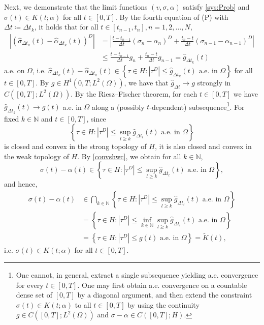 \documentclass[11pt, a4paper]{article}
\newcommand{\N}{{\mathbb N}}
\newcommand{\defeq}{\coloneqq}
\newcommand{\dt}{{\Delta t}}
\newcommand{\Lo}{{L^2(\Omega)}}
\newcommand{\Hs}{{H}}
\begin{document}
Next, we demonstrate that the limit functions $(v, \sigma, \alpha)$ satisfy \eqref{sys:Prob} and $\sigma(t) \in K(t;\alpha)$ for all $t \in [0, T]$.
By the fourth equation of (P) with $\dt\defeq\dt_k$, it holds that for all $t\in[t_{n-1},t_n],n=1,2,\ldots,N$,
\[\begin{aligned}
    |(\hat{\sigma}_{\dt_k}(t) - \hat{\alpha}_{\dt_k}(t))^D| 
    &= \left|\frac{t-t_{n-1}}{\dt}(\sigma_n-\alpha_n)^D 
    + \frac{t_n-t}{\dt}(\sigma_{n-1} - \alpha_{n-1})^D\right|\\
    &\le \frac{t-t_{n-1}}{\dt}g_n + \frac{t_n-t}{\dt}g_{n-1}
    = \hat{g}_{\dt_k}(t)
\end{aligned}\]
a.e. on $\Omega$, i.e. $\hat{\sigma}_{\dt_k}(t) - \hat{\alpha}_{\dt_k}(t) \in \left\{\tau\in\Hs : |\tau^D|\le \hat{g}_{\dt_k}(t) \mbox{ a.e. in }\Omega\right\}$ for all $t\in[0,T]$. 
By $g\in H^1(0,T;\Lo)$, we have that $\hat{g}_\dt \rightarrow g$ strongly in $C([0,T];\Lo)$. By the Riesz--Fischer theorem, for each \(t\in[0,T]\) we have \(\hat g_{\dt_k}(t)\to g(t)\) a.e. in \(\Omega\) along a (possibly \(t\)-dependent) subsequence\footnote{
    One cannot, in general, extract a single subsequence yielding a.e. convergence for every \(t\in[0,T]\).
    One may first obtain a.e. convergence on a countable dense set of \([0,T]\) by a diagonal argument, and then extend the constraint $\sigma(t)\in K(t;\alpha)$ to all \(t\in[0,T]\) by using the continuity \(g\in C([0,T];L^2(\Omega))\) and \(\sigma-\alpha\in C([0,T];\Hs)\).
}. For fixed $k\in\N$ and $t\in[0,T]$, since 
\[
    \left\{\tau\in\Hs : |\tau^D|\le \sup_{l \ge k}\hat{g}_{\dt_l}(t) \mbox{ a.e. in }\Omega\right\}    
\] 
is closed and convex in the strong topology of $\Hs$, it is also closed and convex in the weak topology of $\Hs$. By \eqref{convshwc}, we obtain for all $k\in\N$,
\[
    \sigma(t)-\alpha(t) \in \left\{\tau\in\Hs : |\tau^D|\le \sup_{l \ge k}\hat{g}_{\dt_l}(t) \mbox{ a.e. in }\Omega\right\},
\]
and hence, 
\[\begin{aligned}
    \sigma(t)-\alpha(t) &\in \bigcap_{k\in\N}\left\{\tau\in\Hs : |\tau^D|\le \sup_{l \ge k}\hat{g}_{\dt_l}(t) \mbox{ a.e. in }\Omega\right\}\\
    &= \left\{\tau\in\Hs : |\tau^D|\le \inf_{k\in\N}\sup_{l \ge k}\hat{g}_{\dt_l}(t) \mbox{ a.e. in }\Omega\right\}\\
    &= \left\{\tau\in\Hs : |\tau^D|\le g(t) \mbox{ a.e. in }\Omega\right\}
    = \tilde{K}(t),
\end{aligned}\]
i.e. $\sigma(t)\in K(t;\alpha)$ for all $t\in[0,T]$.
\end{document}
